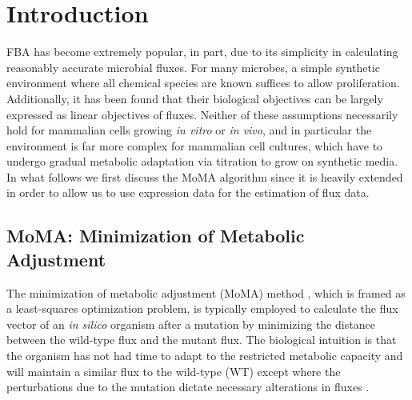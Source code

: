 \section{Introduction}

%
%
FBA has become extremely popular, in part, due to its simplicity in
calculating reasonably accurate microbial fluxes. For many microbes, a
simple synthetic environment where all chemical species are known
suffices to allow proliferation. Additionally, it has been found that
their biological objectives can be largely expressed as linear
objectives of fluxes.  Neither of these assumptions necessarily hold
for mammalian cells growing \emph{in vitro} or \emph{in vivo}, and in
particular the environment is far more complex for mammalian cell
cultures, which have to undergo gradual metabolic adaptation via
titration to grow on synthetic media. In what follows we first discuss
the MoMA algorithm since it is heavily extended in order to allow us
to use expression data for the estimation of flux data.

\subsection{MoMA: Minimization of Metabolic Adjustment}

The minimization of metabolic adjustment (MoMA) method
\citep{Segre2002}, which is framed as a least-squares optimization
problem, is typically employed to calculate the flux vector of an
\emph{in silico} organism after a mutation by minimizing the distance
between the wild-type flux and the mutant flux. The biological
intuition is that the organism has not had time to adapt to the
restricted metabolic capacity and will maintain a similar flux to the
wild-type (WT) except where the perturbations due to the mutation
dictate necessary alterations in fluxes \citep{Shlomi2005}.

